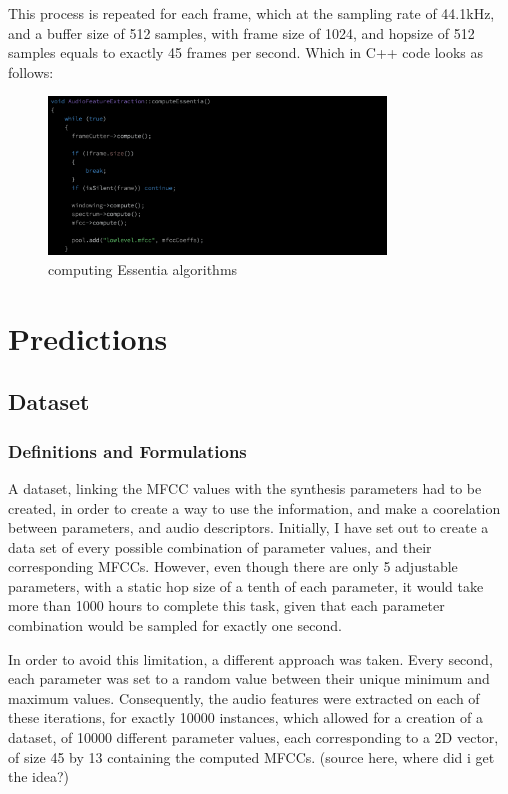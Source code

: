 This process is repeated for each frame, which at the sampling rate of
44.1kHz, and a buffer size of 512 samples, with frame size of 1024,
and hopsize of 512 samples equals to exactly 45 frames per
second. Which in C++ code looks as follows:
\begin{figure}[!h]
\caption{computing Essentia algorithms}
\centering
\includegraphics[width=0.8\textwidth]{images/essentia_algorithms}
\end{figure}

\section{Predictions}
\subsection{Dataset}
\subsubsection{Definitions and Formulations}
A dataset, linking the MFCC values with the synthesis parameters had
to be created, in order to create a way to use the information, and
make a coorelation between parameters, and audio
descriptors. Initially, I have set out to create a data set of every
possible combination of parameter values, and their corresponding
MFCCs. However, even though there are only 5 adjustable parameters,
with a static hop size of a tenth of each parameter, it would take
more than 1000 hours to complete this task, given that each parameter
combination would be sampled for exactly one second.

In order to avoid this limitation, a different approach was
taken. Every second, each parameter was set to a random value between
their unique minimum and maximum values. Consequently, the audio
features were extracted on each of these iterations, for exactly 10000
instances, which allowed for a creation of a dataset, of 10000
different parameter values, each corresponding to a 2D vector, of
size 45 by 13 containing the computed MFCCs. (source here, where
did i get the idea?)

